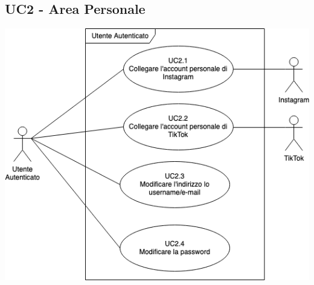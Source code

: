 \subsection{UC2 - Area Personale}
\begin{center}
\includegraphics[scale=0.5]{UC_images/UC2.png}
\end{center}

